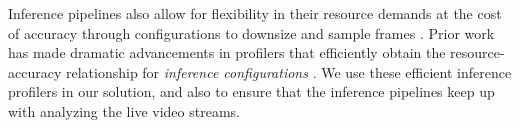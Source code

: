 Inference pipelines also allow for flexibility in their resource demands at the cost of accuracy through configurations to downsize and sample frames \cite{rocket-github}.  
Prior work has made dramatic advancements in %
profilers that efficiently obtain the resource-accuracy relationship for {\em inference configurations} \cite{chameleon}. We use these efficient inference profilers in our solution, and also to ensure that the inference pipelines keep up with analyzing the live video streams. %







